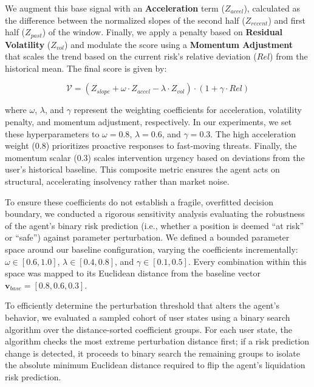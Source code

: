 \documentclass[manuscript,screen,review]{acmart}
\begin{document}
We augment this base signal with an \textbf{Acceleration} term ($Z_{accel}$), calculated as the difference between the normalized slopes of the second half ($Z_{recent}$) and first half ($Z_{past}$) of the window. Finally, we apply a penalty based on \textbf{Residual Volatility} ($Z_{vol}$) and modulate the score using a \textbf{Momentum Adjustment} that scales the trend based on the current risk's relative deviation ($Rel$) from the historical mean. The final score is given by:

\begin{equation}
\label{eq:v}
    \mathcal{V} = (Z_{slope} + \omega \cdot Z_{accel} - \lambda \cdot Z_{vol}) \cdot (1 + \gamma \cdot Rel)
\end{equation}

\noindent where $\omega$, $\lambda$, and $\gamma$ represent the weighting coefficients for acceleration, volatility penalty, and momentum adjustment, respectively.
In our experiments, we set these hyperparameters to $\omega=0.8$, $\lambda=0.6$, and $\gamma=0.3$. The high acceleration weight (0.8) prioritizes proactive responses to fast-moving threats.  Finally, the momentum scalar (0.3) scales intervention urgency based on deviations from the user's historical baseline. This composite metric ensures the agent acts on structural, accelerating insolvency rather than market noise.

To ensure these coefficients do not establish a fragile, overfitted decision boundary, we conducted a rigorous sensitivity analysis evaluating the robustness of the agent's binary risk prediction (i.e., whether a position is deemed ``at risk'' or ``safe'') against parameter perturbation. We defined a bounded parameter space around our baseline configuration, varying the coefficients incrementally: $\omega \in [0.6, 1.0]$, $\lambda \in [0.4, 0.8]$, and $\gamma \in [0.1, 0.5]$. Every combination within this space was mapped to its Euclidean distance from the baseline vector $\mathbf{v}_{base} = [0.8, 0.6, 0.3]$. 

To efficiently determine the perturbation threshold that alters the agent's behavior, we evaluated a sampled cohort of user states using a binary search algorithm over the distance-sorted coefficient groups. For each user state, the algorithm checks the most extreme perturbation distance first; if a risk prediction change is detected, it proceeds to binary search the remaining groups to isolate the absolute minimum Euclidean distance required to flip the agent's liquidation risk prediction. 
\end{document}
